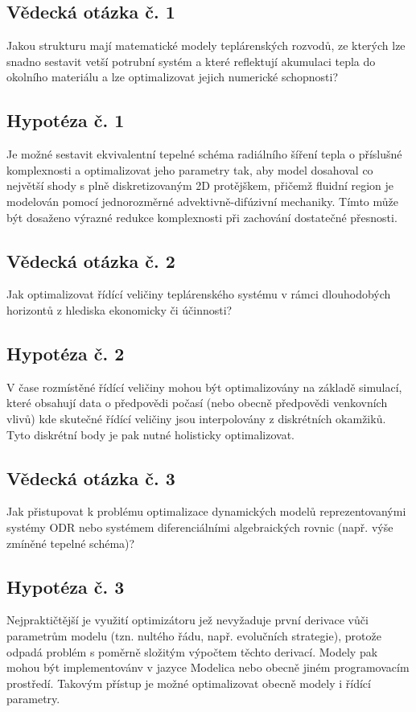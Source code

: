 \subsection*{Vědecká otázka č. 1}
Jakou strukturu mají matematické modely teplárenských rozvodů, ze kterých lze
snadno sestavit vetší potrubní systém a které reflektují akumulaci tepla do
okolního materiálu a lze optimalizovat jejich numerické schopnosti?
\subsection*{Hypotéza č. 1}
Je možné sestavit ekvivalentní tepelné schéma radiálního šíření tepla o
příslušné komplexnosti a optimalizovat jeho parametry tak, aby model dosahoval
co největší shody s plně diskretizovaným 2D protějškem, přičemž fluidní
region je modelován pomocí jednorozměrné advektivně-difúzivní mechaniky. Tímto
může být dosaženo výrazné redukce komplexnosti při zachování dostatečné
přesnosti.
\subsection*{Vědecká otázka č. 2}
Jak optimalizovat řídící veličiny teplárenského systému v rámci dlouhodobých
horizontů z hlediska ekonomicky či účinnosti?
\subsection*{Hypotéza č. 2}
V čase rozmístěné řídící veličiny mohou být optimalizovány na základě simulací,
které obsahují data o předpovědi počasí (nebo obecně předpovědi venkovních
vlivů) kde skutečné řídící veličiny jsou interpolovány z diskrétních okamžiků.
Tyto diskrétní body je pak nutné holisticky optimalizovat.
\subsection*{Vědecká otázka č. 3}
Jak přistupovat k problému optimalizace dynamických modelů reprezentovanými
systémy ODR nebo systémem diferenciálními algebraických rovnic (např. výše
zmíněné tepelné schéma)?
\subsection*{Hypotéza č. 3}
Nejpraktičtější je využití optimizátoru jež nevyžaduje první derivace vůči
parametrům modelu (tzn. nultého řádu, např. evolučních strategie), protože
odpadá problém s poměrně složitým výpočtem těchto derivací. Modely pak mohou
být implementovánv v jazyce Modelica nebo obecně jiném programovacím prostředí.
Takovým přístup je možné optimalizovat obecně modely i řídící parametry.
